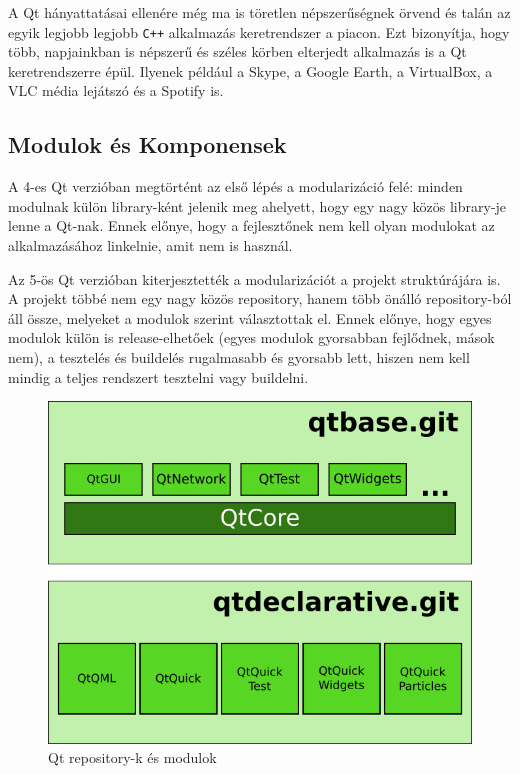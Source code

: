\documentclass[12pt]{report}
\begin{document}
A Qt hányattatásai ellenére még ma is töretlen népszerűségnek örvend és talán az egyik
legjobb legjobb \texttt{C++} alkalmazás keretrendszer a piacon. Ezt bizonyítja,
hogy több, napjainkban is népszerű és széles körben elterjedt alkalmazás is a
Qt keretrendszerre épül. Ilyenek például a Skype, a Google Earth, a VirtualBox,
a VLC média lejátszó és a Spotify is.

\subsection{Modulok és Komponensek}
A 4-es Qt verzióban megtörtént az első lépés a modularizáció felé: minden modulnak külön
library-ként jelenik meg ahelyett, hogy egy nagy közös library-je lenne a Qt-nak.
Ennek előnye, hogy a fejlesztőnek nem kell olyan modulokat az alkalmazásához linkelnie,
amit nem is használ.

Az 5-ös Qt verzióban kiterjesztették a modularizációt a projekt struktúrájára is. A projekt
többé nem egy nagy közös repository, hanem több önálló repository-ból áll össze, melyeket
a modulok szerint választottak el. Ennek előnye, hogy egyes modulok külön is release-elhetőek
(egyes modulok gyorsabban fejlődnek, mások nem), a tesztelés és buildelés rugalmasabb és
gyorsabb lett, hiszen nem kell mindig a teljes rendszert tesztelni vagy buildelni.

\begin{figure}[h]
    \centering
    \includegraphics[scale=.66]{qt-repos-and-modules}
    \caption{
        \label{fig:qt-repos-and-modules}
        Qt repository-k és modulok
    }
\end{figure}
\end{document}

